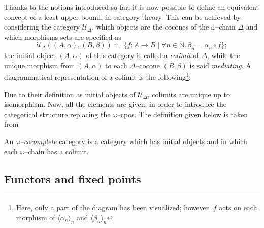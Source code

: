 Thanks to the notions introduced so far, it is now possible to define an equivalent concept of a least upper bound, in category theory.
This can be achieved by considering the category \(\mathcal{U}_\Delta\), which objects are the cocones of the \(\omega\)--chain \(\Delta\) and which morphisms sets are specified as %
\begin{equation*}
  \mathcal{U}_\Delta((A,\alpha),(B,\beta)) := \lbrace f \colon A \to B \mid
  \forall n \in \mathbb{N}.\,\beta_n = \alpha_n \circ f \rbrace;
\end{equation*}
the initial object \((A, \alpha)\) of this category is called a \emph{colimit} of \(\Delta\), while the unique morphism from \((A,\alpha)\) to each \(\Delta\)--cocone \((B, \beta)\) is said \emph{mediating}. %
A diagrammatical representation of a colimit is the following\footnote{Here, only a part of the diagram has been visualized; however, \(f\) acts on each morphism of \(\langle \alpha_n \rangle_n\) and \(\langle \beta_n \rangle_n\)}:
\begin{center}
\end{center}
Due to their definition as initial objects of \(\mathcal{U}_\Delta\), colimits are unique up to isomorphism. %
Now, all the elements are given, in order to introduce the categorical structure replacing the \(\omega\)--cpos. %
The definition given below is taken from~\cite{Hemerik1988}

\begin{dfn}
  An \emph{\(\omega\)--cocomplete} category is a category which has initial objects and in which each \(\omega\)--chain has a colimit. %
\end{dfn}

\subsection{Functors and fixed points}


